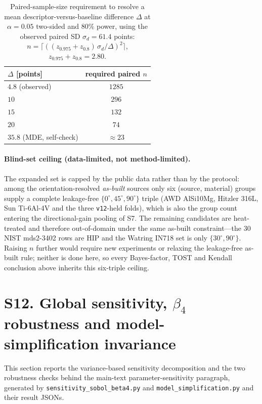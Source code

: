 \documentclass[11pt,a4paper,twocolumn]{article}
\providecommand{\ang}[1]{\ensuremath{#1^{\circ}}}
\begin{document}
\begin{table}[htbp]
\centering
\caption{Paired-sample-size requirement to resolve a mean descriptor-versus-baseline difference $\Delta$ at
$\alpha=0.05$ two-sided and $80\%$ power, using the observed paired SD $\sigma_d=61.4$ points:
$n=\lceil((z_{0.975}+z_{0.8})\,\sigma_d/\Delta)^2\rceil$, $z_{0.975}+z_{0.8}=2.80$.}
\label{tab:si_powern}
\footnotesize
\begin{tabular}{lc}
\toprule
$\Delta$ [points] & required paired $n$ \\
\midrule
$4.8$ (observed) & $1285$ \\
$10$ & $296$ \\
$15$ & $132$ \\
$20$ & $74$ \\
$35.8$ (MDE, self-check) & $\approx 23$ \\
\bottomrule
\end{tabular}
\end{table}

\paragraph{Blind-set ceiling (data-limited, not method-limited).}
The expanded set is capped by the public data rather than by the protocol: among the orientation-resolved
\emph{as-built} sources only six (source, material) groups supply a complete leakage-free
$\{\ang{0},\ang{45},\ang{90}\}$ triple (AWD AlSi10Mg, Hitzler 316L, Sun Ti-6Al-4V and the three \texttt{v12}-held
folds), which is also the group count entering the directional-gain pooling of S7. The remaining candidates are
heat-treated and therefore out-of-domain under the same as-built constraint---the 30 NIST mds2-3402 rows are HIP and
the Watring IN718 set is only $\{\ang{30},\ang{90}\}$. Raising $n$ further would require new experiments or relaxing
the leakage-free as-built rule; neither is done here, so every Bayes-factor, TOST and Kendall conclusion above
inherits this six-triple ceiling.

\section*{S12. Global sensitivity, $\beta_4$ robustness and model-simplification invariance}

This section reports the variance-based sensitivity decomposition and the two robustness checks behind the
main-text parameter-sensitivity paragraph, generated by \texttt{sensitivity\_sobol\_beta4.py} and
\texttt{model\_simplification.py} and their result JSONs.
\end{document}
